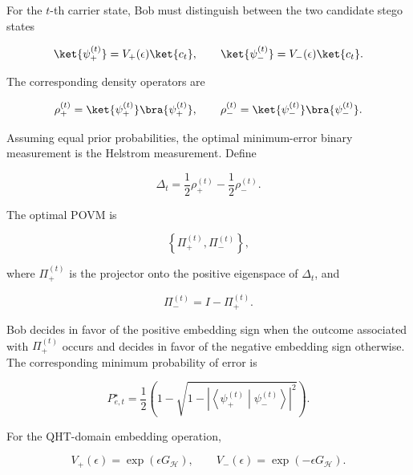 \documentclass[11pt]{article}
\theoremstyle{plain}
\theoremstyle{definition}
\theoremstyle{remark}
\begin{document}
For the $t$-th carrier state, Bob must distinguish between the two candidate stego states

\begin{equation}
\ket{\psi_{+}^{(t)}}
=
V_{+}(\epsilon)\ket{c_t},
\qquad
\ket{\psi_{-}^{(t)}}
=
V_{-}(\epsilon)\ket{c_t}.
\end{equation}

The corresponding density operators are

\begin{equation}
\rho_{+}^{(t)}
=
\ket{\psi_{+}^{(t)}}
\bra{\psi_{+}^{(t)}},
\qquad
\rho_{-}^{(t)}
=
\ket{\psi_{-}^{(t)}}
\bra{\psi_{-}^{(t)}}.
\end{equation}

Assuming equal prior probabilities, the optimal minimum-error binary measurement is the Helstrom measurement. Define

\begin{equation}
\Delta_t
=
\frac{1}{2}\rho_{+}^{(t)}
-
\frac{1}{2}\rho_{-}^{(t)}.
\end{equation}

The optimal POVM is

\begin{equation}
\left\{
\Pi_{+}^{(t)},
\Pi_{-}^{(t)}
\right\},
\end{equation}

where $\Pi_{+}^{(t)}$ is the projector onto the positive eigenspace of $\Delta_t$, and

\begin{equation}
\Pi_{-}^{(t)}
=
I-\Pi_{+}^{(t)}.
\end{equation}

Bob decides in favor of the positive embedding sign when the outcome associated with $\Pi_{+}^{(t)}$ occurs and decides in favor of the negative embedding sign otherwise. The corresponding minimum probability of error is

\begin{equation}
P_{e,t}^{\star}
=
\frac{1}{2}
\left(
1-
\sqrt{
1-
\left|
\left\langle
\psi_{+}^{(t)}
\middle|
\psi_{-}^{(t)}
\right\rangle
\right|^2
}
\right).
\end{equation}

For the QHT-domain embedding operation,

\begin{equation}
V_{+}(\epsilon)
=
\exp\left(
\epsilon G_{\mathcal H}
\right),
\qquad
V_{-}(\epsilon)
=
\exp\left(
-\epsilon G_{\mathcal H}
\right).
\end{equation}
\end{document}
